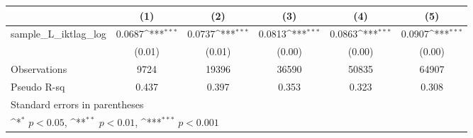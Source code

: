 {
\def\sym#1{\ifmmode^{#1}\else\(^{#1}\)\fi}
\begin{tabular}{l*{5}{c}}
\hline\hline
          &\multicolumn{1}{c}{(1)}         &\multicolumn{1}{c}{(2)}         &\multicolumn{1}{c}{(3)}         &\multicolumn{1}{c}{(4)}         &\multicolumn{1}{c}{(5)}         \\
\hline
sample\_L\_iktlag\_log&   0.0687\sym{***}&   0.0737\sym{***}&   0.0813\sym{***}&   0.0863\sym{***}&   0.0907\sym{***}\\
          &   (0.01)         &   (0.01)         &   (0.00)         &   (0.00)         &   (0.00)         \\
\hline
Observations&     9724         &    19396         &    36590         &    50835         &    64907         \\
Pseudo R-sq&    0.437         &    0.397         &    0.353         &    0.323         &    0.308         \\
\hline\hline
\multicolumn{6}{l}{\footnotesize Standard errors in parentheses}\\
\multicolumn{6}{l}{\footnotesize \sym{*} \(p<0.05\), \sym{**} \(p<0.01\), \sym{***} \(p<0.001\)}\\
\end{tabular}
}

